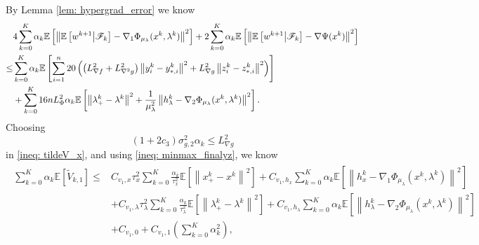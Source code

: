 \documentclass[10pt]{article}
\theoremstyle{remark}
\def\setF{\mathscr{F}} %
\newcommand{\E}{\mathbb{E}}
\newcommand{\norm}[1]{\left\|#1\right\|}
\begin{document}
By Lemma \ref{lem: hypergrad_error} we know
\begin{align}
    &4\sum_{k=0}^{K}\alpha_k\E\left[\norm{\E\left[w^{k+1}\middle|\setF_k\right] -\nabla_1\Phi_{\mu_{\lambda}}(x^k,\lambda^k)}^2\right] + 2\sum_{k=0}^{K}\alpha_k\E\left[\norm{\E\left[w^{k+1}\middle|\setF_k\right] - \nabla\Psi(x^k)}^2\right] \notag\\
    \leq & \sum_{k=0}^{K}\alpha_k\E\left[\sum_{i=1}^{n}20\left(\left(L_{\nabla f}^2 + L_{\nabla^2 g}^2\right)\norm{y_i^k - y_{*,i}^k}^2 + L_{\nabla g}^2\norm{z_i^k - z_{*,i}^k}^2\right)\right] \notag\\
    & + \sum_{k=0}^{K}16nL_{\Phi}^2\alpha_k\E\left[\norm{\lambda_+^k - \lambda^k}^2 + \frac{1}{\mu_{\lambda}^2}\norm{h_{\lambda}^k - \nabla_2\Phi_{\mu_{\lambda}}(x^k, \lambda^k)}^2\right]. \label{ineq: minmax_finalyz}
\end{align}
Choosing 
\begin{equation}\label{ineq: minmax_alpha_condition}
    \left(1+2c_3\right)\sigma_{g,2}^2\alpha_k\leq L_{\nabla g}^2
\end{equation}
in \eqref{ineq: tildeV_x}, and using \eqref{ineq: minmax_finalyz}, we know 
\begin{align}\label{ineq: tildeV_1_final}
    \begin{aligned}
        \sum_{k=0}^{K}\alpha_k\E\left[\tilde V_{k,1}\right]\leq &C_{v_1, x}\tau_x^2\sum_{k=0}^{K}\frac{\alpha_k}{\tau_x^2}\E\left[\norm{x_+^k - x^k}^2\right] + C_{v_1, h_x}\sum_{k=0}^{K}\alpha_k\E\left[\norm{h_x^k - \nabla_1\Phi_{\mu_{\lambda}}(x^k,\lambda^k)}^2\right] \\
        &+ C_{v_1, \lambda}\tau_{\lambda}^2\sum_{k=0}^{K}\frac{\alpha_k}{\tau_{\lambda}^2}\E\left[\norm{\lambda_+^k - \lambda^k}^2\right] +   C_{v_1, h_{\lambda}}\sum_{k=0}^{K}\alpha_k\E\left[\norm{h_{\lambda}^k - \nabla_2\Phi_{\mu_{\lambda}}(x^k, \lambda^k)}^2\right]  \\
        &+ C_{v_1, 0} + C_{v_1, 1}\left(\sum_{k=0}^{K}\alpha_k^2\right),
    \end{aligned}
\end{align}
\end{document}
